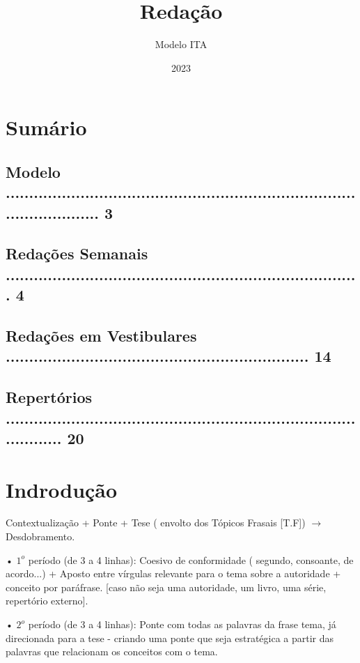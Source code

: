 \documentclass{article}
\title {Redação}
\author{ Modelo ITA}
\date{2023}
\begin{document}
\maketitle
\newpage


\section*{Sumário}
\subsection*{Modelo ............................................................................................... 3}
\hspace{1,5in}

\subsection*{Redações Semanais ............................................................................ 4}
\hspace{1,5in}

\subsection*{Redações em Vestibulares ................................................................. 14 } 
\hspace{1,5in}

\subsection*{Repertórios ....................................................................................... 20}

\newpage
\section*{Indrodução}
\noindent
Contextualização + Ponte + Tese ( envolto dos Tópicos Frasais [T.F]) $\rightarrow$ Desdobramento.


•   $1^o$ período (de 3 a 4 linhas):  Coesivo de conformidade ( segundo, consoante, de acordo...) + Aposto entre vírgulas relevante para o tema sobre a autoridade + conceito por paráfrase. [caso não seja uma autoridade, um livro, uma série, repertório externo].



• $2^o$ período (de 3 a 4 linhas): Ponte com todas as palavras da frase tema, já direcionada para a tese - criando uma ponte que seja estratégica a partir das palavras que relacionam os conceitos com o tema.
\end{document}
